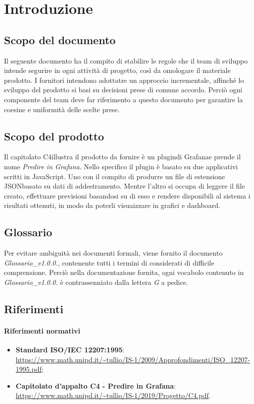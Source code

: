 \section{Introduzione}

\subsection{Scopo del documento}
Il seguente documento ha il compito di stabilire le regole che il team di sviluppo intende segurire in ogni attività di progetto, così da omologare il materiale prodotto.
I fornitori intendono adottatre un approccio incrementale\glo, affinché lo sviluppo del prodotto si basi su decisioni prese di comune accordo. Perciò ogni componente del team deve far riferimento a questo documento per garantire la coesine e uniformità delle scelte prese.

\subsection{Scopo del prodotto}
Il capitolato {C4}\glo illustra il prodotto da fornire è un plugin\glo di Grafana\glo e prende il nome \textit{Predire in Grafana}. Nello specifico il plugin è basato su due applicativi scritti in JavaScript\glo. Uno con il compito di produrre un file di estensione JSON\glo basato su dati di addestramento\glo. Mentre l'altro si occupa di leggere il file creato, effettuare previsioni basandosi su di esso e rendere disponibili al sistema i risultati ottenuti, in modo da poterli 	visuaizzare in grafici e dashboard.
\subsection{Glossario}
Per evitare ambiguità nei documenti formali, viene fornito il documento \textit{Glossario\_v1.0.0.}, contenente tutti i termini di considerati di difficile comprensione. Perciò nella documentazione fornita, ogni vocabolo contenuto in \textit{Glossario\_v1.0.0.} è contrassenniato dalla lettera \textit{G} a pedice.
\subsection{Riferimenti}
\paragraph{Riferimenti normativi}
\begin{itemize}
	\item \textbf{Standard ISO/IEC 12207:1995}: \\
	\url{https://www.math.unipd.it/~tullio/IS-1/2009/Approfondimenti/ISO_12207-1995.pdf};
	\item \textbf{Capitolato d'appalto C4 - Predire in Grafana}: \\
	\url{https://www.math.unipd.it/~tullio/IS-1/2019/Progetto/C4.pdf}.	
\end{itemize}
